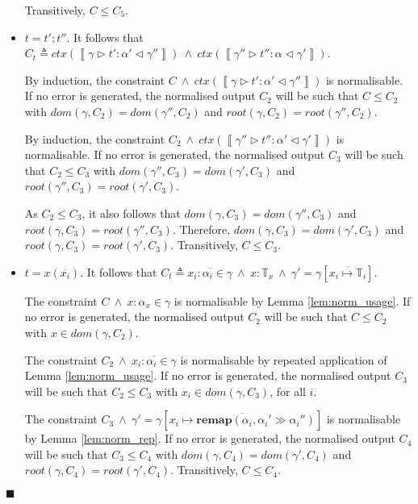 \documentclass[preprint]{sigplanconf}
\newcommand{\lemref}[1]{Lemma \ref{#1}}
\newcommand{\remapapp}[3]{\ensuremath{\mathbf{remap}(#1, #2 \gg #3)}}
\newcommand{\inferrule}[4]{\left\llbracket #1 \triangleright #2 : #3 \triangleleft #4 \right\rrbracket}
\newcommand{\cand}{\:\wedge\:}
\newcommand{\tinf}{\mathbb{T}}
\newcommand{\qed}{$\blacksquare$}
\newenvironment{proof}{\vspace{1ex}\noindent{\bf Proof}\hspace{0.5em}}
  {\hfill\qed\vspace{1ex}}
\begin{document}
\begin{proof}
\begin{itemize}
Transitively, $C \leq C_5$.



\item $t = t' ; t''$.
It follows that
$C_t \triangleq 
ctx(\inferrule{\gamma}{t'}{\alpha'}{\gamma''}) \cand
ctx(\inferrule{\gamma''}{t''}{\alpha}{\gamma'})$.

By induction, the constraint 
$C \cand ctx(\inferrule{\gamma}{t'}{\alpha'}{\gamma''})$ is normalisable.
If no error is generated, the normalised output $C_2$ will be such that
$C \leq C_2$ with $dom(\gamma, C_2) = dom(\gamma'', C_2)$ and
$root(\gamma, C_2) = root(\gamma'', C_2)$.

By induction, the constraint
$C_2 \cand ctx(\inferrule{\gamma''}{t''}{\alpha'}{\gamma'})$ is normalisable.
If no error is generated, the normalised output $C_3$ will be such that
$C_2 \leq C_3$ with $dom(\gamma'', C_3) = dom(\gamma', C_3)$ and
$root(\gamma'', C_3) = root(\gamma', C_3)$.

As $C_2 \leq C_3$, it also follows that $dom(\gamma, C_3) = dom(\gamma'', C_3)$
and $root(\gamma, C_3) = root(\gamma'', C_3)$. Therefore,
$dom(\gamma, C_3) = dom(\gamma', C_3)$ and 
$root(\gamma, C_3) = root(\gamma', C_3)$. Transitively, $C \leq C_3$.

\item $t = x(\overline{x_i})$.
It follows that
$C_t \triangleq \overline{x_i : \alpha_i \in \gamma} \cand 
x : \tinf_x \cand
\gamma' = \gamma[\overline{x_i \mapsto \tinf_i}]
$.

The constraint $C \cand x : \alpha_x \in \gamma$ is normalisable by 
\lemref{lem:norm_usage}. If no error is generated, the normalised output $C_2$ will be such that $C \leq C_2$ with $x \in dom(\gamma, C_2)$.

The constraint $C_2 \cand \overline{x_i : \alpha_i \in \gamma}$ is normalisable
by repeated application of \lemref{lem:norm_usage}. If no error is generated, the normalised output $C_3$ will be such that $C_2 \leq C_3$ with
$x_i \in dom(\gamma, C_3)$, for all $i$.

The constraint $C_3 \cand \gamma' = \gamma[\overline{x_i \mapsto \remapapp{\alpha_i}{\alpha_i'}{\alpha_i''}}]$
is normalisable by \lemref{lem:norm_rep}. If no error is generated, the
normalised output $C_4$ will be such that $C_3 \leq C_4$ with
$dom(\gamma, C_4) = dom(\gamma', C_4)$ and $root(\gamma, C_4) = root(\gamma', C_4)$. Transitively, $C \leq C_4$.


\end{itemize}
\end{proof}
\end{document}
